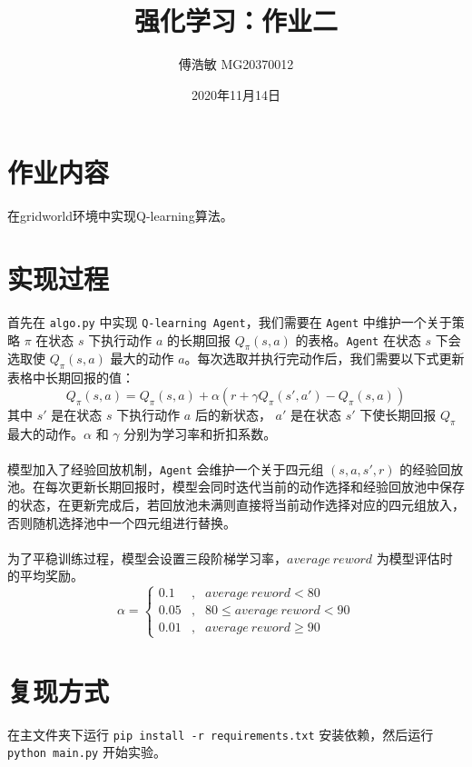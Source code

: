\documentclass[a4paper,12pt]{article}
\begin{document}
\begin{CJK}{UTF8}{gbsn}

\title{强化学习：作业二}

\author{傅浩敏 MG20370012}

\date{2020年11月14日}

\maketitle

\section{作业内容}
在gridworld环境中实现Q-learning算法。

\section{实现过程}
首先在 \texttt{algo.py} 中实现 \texttt{Q-learning Agent}，我们需要在 \texttt{Agent} 中维护一个关于策略 $\pi$ 在状态 $s$ 下执行动作 $a$ 的长期回报 $Q_\pi(s,a)$ 的表格。\texttt{Agent} 在状态 $s$ 下会选取使 $Q_\pi(s,a)$ 最大的动作 $a$。每次选取并执行完动作后，我们需要以下式更新表格中长期回报的值：
$$Q_\pi(s,a)=Q_\pi(s,a)+\alpha(r+\gamma Q_\pi(s',a')-Q_\pi(s,a))$$
其中 $s'$ 是在状态 $s$ 下执行动作 $a$ 后的新状态， $a'$ 是在状态 $s'$ 下使长期回报 $Q_\pi$ 最大的动作。$\alpha$ 和 $\gamma$ 分别为学习率和折扣系数。\\\\
模型加入了经验回放机制，\texttt{Agent} 会维护一个关于四元组 $(s,a,s',r)$ 的经验回放池。在每次更新长期回报时，模型会同时迭代当前的动作选择和经验回放池中保存的状态，在更新完成后，若回放池未满则直接将当前动作选择对应的四元组放入，否则随机选择池中一个四元组进行替换。\\\\
为了平稳训练过程，模型会设置三段阶梯学习率，$average\ reword$ 为模型评估时的平均奖励。
$$\alpha=\left\{\begin{aligned}
0.1 &,& average\ reword<80 \\
0.05 &,& 80\leq average\ reword<90 \\
0.01 &,& average\ reword\geq 90
\end{aligned}\right.$$
\section{复现方式}
在主文件夹下运行 \texttt{pip install -r requirements.txt} 安装依赖，然后运行 \texttt{python main.py} 开始实验。

\end{CJK}
\end{document}
